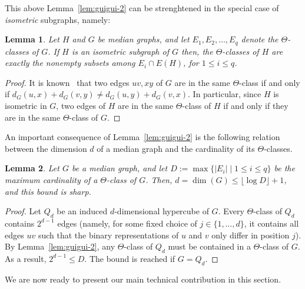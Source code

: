 \documentclass{article}
\newtheorem{lemma}{Lemma}
\begin{document}
This above Lemma~\ref{lem:guigui-2} can be strenghtened in the special case of {\em isometric} subgraphs, namely:

\begin{lemma}\label{lem:guigui-2bis}
Let $H$ and $G$ be median graphs, and let $E_1,E_2,\ldots,E_q$ denote the $\Theta$-classes of $G$.
If $H$ is an isometric subgraph of $G$ then, the $\Theta$-classes of $H$ are exactly the nonempty subsets among $E_i \cap E(H)$, for $1 \leq i \leq q$.
\end{lemma}
\begin{proof}
It is known~\cite{winkler1984isometric} that two edges $uv,xy$ of $G$ are in the same $\Theta$-class if and only if $d_G(u,x) + d_G(v,y) \neq d_G(u,y) + d_G(v,x)$.
In particular, since $H$ is isometric in $G$, two edges of $H$ are in the same $\Theta$-class of $H$ if and only if they are in the same $\Theta$-class of $G$.
\end{proof}

An important consequence of Lemma~\ref{lem:guigui-2} is the following relation between the dimension $d$ of a median graph and the cardinality of its $\Theta$-classes.

\begin{lemma}\label{lem:guigui-3}
Let $G$ be a median graph, and let $D := \max\{ |E_i| \mid 1 \leq i \leq q\}$ be the maximum cardinality of a $\Theta$-class of $G$. Then, $d = \dim(G) \leq \lfloor\log{D}\rfloor + 1$, and this bound is sharp.
\end{lemma}
\begin{proof}
Let $Q_d$ be an induced $d$-dimensional hypercube of $G$.
Every $\Theta$-class of $Q_d$ contains $2^{d-1}$ edges (namely, for some fixed choice of $j \in \{1,\ldots,d\}$, it contains all edges $uv$ such that the binary representations of $u$ and $v$ only differ in position $j$).
By Lemma~\ref{lem:guigui-2}, any $\Theta$-class of $Q_d$ must be contained in a $\Theta$-class of $G$.
As a result, $2^{d-1} \leq D$.
The bound is reached if $G = Q_d$.
\end{proof}

We are now ready to present our main technical contribution in this section.
\end{document}
